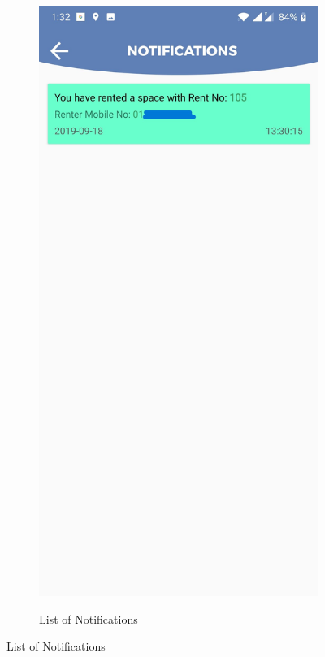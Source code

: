 \documentclass[12pt, english]{article}
\begin{document}
\begin{figure}[h!]
\begin{subfigure}[t]{0.4\textwidth}
    \includegraphics[width=\linewidth]{Notification/notification_showing.jpg}
        \label{arch5}
        \caption{List of Notifications}

\end{subfigure}
\end{figure}
\end{document}
